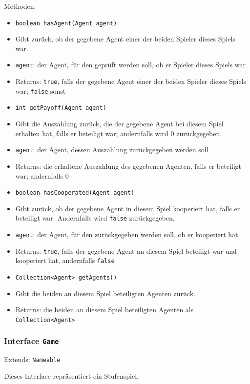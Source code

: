 \documentclass[parskip=full,11pt]{scrartcl}
\begin{document}
Methoden:
\begin{itemize}\itemsep -10pt
\item  \texttt{boolean hasAgent(Agent agent)}
\item[] Gibt zurück, ob der gegebene Agent einer der beiden Spieler dieses Spiels war.
\item[] \texttt{agent}: der Agent, für den geprüft werden soll, ob er Spieler dieses Spiels war
\item[] Returns: \texttt{true}, falls der gegebene Agent einer der beiden Spieler dieses Spiels war; \texttt{false} sonst

\item \texttt{int getPayoff(Agent agent)}
\item[] Gibt die Auszahlung zurück, die der gegebene Agent bei diesem Spiel erhalten hat, falls er beteiligt war; andernfalls wird \(0\) zurückgegeben.
\item[] \texttt{agent}: der Agent, dessen Auszahlung zurückgegeben werden soll
\item[] Returns: die erhaltene Auszahlung des gegebenen Agenten, falls er beteiligt war; andernfalls \(0\)

\item \texttt{boolean hasCooperated(Agent agent)}
\item[] Gibt zurück, ob der gegebene Agent in diesem Spiel kooperiert hat, falls er beteiligt war. Andernfalls wird \texttt{false} zurückgegeben.
\item[] \texttt{agent}: der Agent, für den zurückgegeben werden soll, ob er kooperiert hat
\item[] Returns: \texttt{true}, falls der gegebene Agent an diesem Spiel beteiligt war und kooperiert hat, andernfalls \texttt{false}

\item \texttt{Collection<Agent> getAgents()}
\item[] Gibt die beiden an diesem Spiel beteiligten Agenten zurück.
\item[] Returns: die beiden an diesem Spiel beteiligten Agenten als \texttt{Collection<Agent>}
\end{itemize}

\subsubsection{Interface \texttt{Game}}
Extends: \texttt{Nameable}

Dieses Interface repräsentiert ein Stufenspiel.
\end{document}
